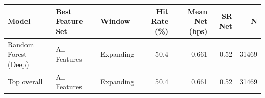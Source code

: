 \begin{tabular}{lllrrrr}
\toprule
Model & Best Feature Set & Window & Hit Rate (\%) & Mean Net (bps) & SR Net & N \\
\midrule
Random Forest (Deep) & All Features & Expanding & 50.4 & 0.661 & 0.52 & 31469 \\
\midrule
Top overall & All Features & Expanding & 50.4 & 0.661 & 0.52 & 31469 \\
\bottomrule
\end{tabular}
